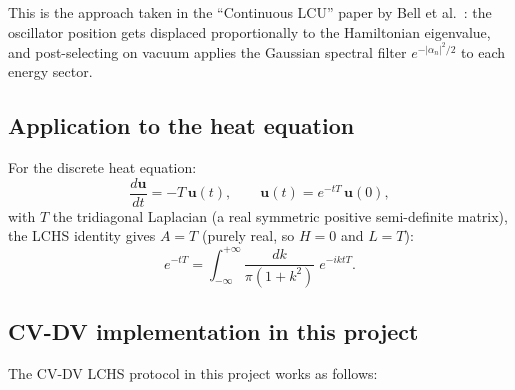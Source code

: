 \documentclass[11pt]{article}
\begin{document}
This is the approach taken in the ``Continuous LCU'' paper by Bell et al.\
\cite{Bell2025}: the oscillator position gets displaced proportionally to
the Hamiltonian eigenvalue, and post-selecting on vacuum applies the
Gaussian spectral filter $e^{-|\alpha_n|^2/2}$ to each energy sector.

\subsection{Application to the heat equation}

For the discrete heat equation:
\begin{equation}
\frac{d\bm{u}}{dt} = -T\,\bm{u}(t),
\qquad \bm{u}(t) = e^{-tT}\,\bm{u}(0),
\end{equation}
with $T$ the tridiagonal Laplacian (a real symmetric positive
semi-definite matrix), the LCHS identity gives $A = T$ (purely real, so
$H = 0$ and $L = T$):
\begin{equation}
e^{-tT} = \int_{-\infty}^{+\infty} \frac{dk}{\pi(1+k^2)}\;
e^{-iktT}.
\end{equation}

\subsection{CV-DV implementation in this project}

The CV-DV LCHS protocol in this project works as follows:
\end{document}
